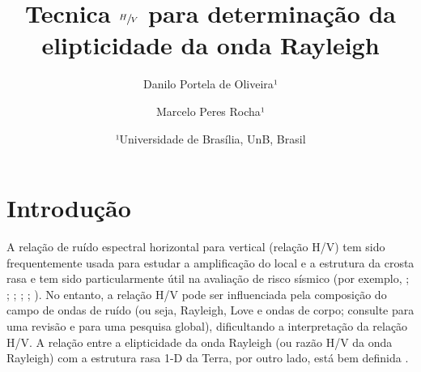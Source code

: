 \documentclass[smallextended]{svjour3}       %
\begin{document}
\title{Tecnica $\sfrac{H}{V}$ para determinação da elipticidade da onda Rayleigh}
\subtitle{}


\author{Danilo Portela de Oliveira¹\and Marcelo Peres Rocha¹         
}



\date{¹Universidade de Brasília, UnB, Brasil}


\maketitle


\begin{abstract}

\lipsum[1]
\keywords{%
}
\end{abstract}


\newpage

\section{Introdução}

A relação de ruído espectral horizontal para vertical (relação H/V) \citep{nakamura1989method} tem sido frequentemente usada para estudar a amplificação do local e a estrutura da crosta rasa e tem sido particularmente útil na avaliação de risco sísmico (por exemplo, \citealp{field1993theoretical}; \citealp{bonilla1997site}; \citealp{konno1998ground}; \citealp{riepl1998detailed}; \citealp{parolai2002new}; \citealp{bonnefoy2006nature}). No entanto, a relação H/V pode ser influenciada pela composição do campo de ondas de ruído (ou seja, Rayleigh, Love e ondas de corpo; consulte \citealp{bonnefoy2006nature} para uma revisão e \citealp{koper2010composition} para uma pesquisa global), dificultando a interpretação da relação H/V. A relação entre a elipticidade da onda Rayleigh (ou razão H/V da onda Rayleigh) com a estrutura rasa 1-D da Terra, por outro lado, está bem definida \citep{tanimoto2008zh}. 
\end{document}
